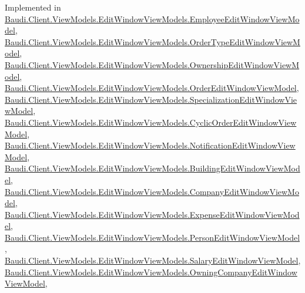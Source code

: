 Implemented in \hyperlink{class_baudi_1_1_client_1_1_view_models_1_1_edit_window_view_models_1_1_employee_edit_window_view_model_a13a345a4c410f06daf9079520a31d5f6}{Baudi.\+Client.\+View\+Models.\+Edit\+Window\+View\+Models.\+Employee\+Edit\+Window\+View\+Model}, \hyperlink{class_baudi_1_1_client_1_1_view_models_1_1_edit_window_view_models_1_1_order_type_edit_window_view_model_a48e5d33ce4f04d3cef96b3c63ef1409a}{Baudi.\+Client.\+View\+Models.\+Edit\+Window\+View\+Models.\+Order\+Type\+Edit\+Window\+View\+Model}, \hyperlink{class_baudi_1_1_client_1_1_view_models_1_1_edit_window_view_models_1_1_ownership_edit_window_view_model_a82f0ab3b2df4452117fd1d4f97ba0cfd}{Baudi.\+Client.\+View\+Models.\+Edit\+Window\+View\+Models.\+Ownership\+Edit\+Window\+View\+Model}, \hyperlink{class_baudi_1_1_client_1_1_view_models_1_1_edit_window_view_models_1_1_order_edit_window_view_model_ade8351d2753ab70dc1084117dc3ae177}{Baudi.\+Client.\+View\+Models.\+Edit\+Window\+View\+Models.\+Order\+Edit\+Window\+View\+Model}, \hyperlink{class_baudi_1_1_client_1_1_view_models_1_1_edit_window_view_models_1_1_specialization_edit_window_view_model_a9b65b5193fa8bf34c1f224ac1c257b33}{Baudi.\+Client.\+View\+Models.\+Edit\+Window\+View\+Models.\+Specialization\+Edit\+Window\+View\+Model}, \hyperlink{class_baudi_1_1_client_1_1_view_models_1_1_edit_window_view_models_1_1_cyclic_order_edit_window_view_model_a4ea63b211ca97a8337af850b415f47a4}{Baudi.\+Client.\+View\+Models.\+Edit\+Window\+View\+Models.\+Cyclic\+Order\+Edit\+Window\+View\+Model}, \hyperlink{class_baudi_1_1_client_1_1_view_models_1_1_edit_window_view_models_1_1_notification_edit_window_view_model_a3dd14080d055dab5c537805c427ef784}{Baudi.\+Client.\+View\+Models.\+Edit\+Window\+View\+Models.\+Notification\+Edit\+Window\+View\+Model}, \hyperlink{class_baudi_1_1_client_1_1_view_models_1_1_edit_window_view_models_1_1_building_edit_window_view_model_a037fe91ae03a5a2652cf131509f4f672}{Baudi.\+Client.\+View\+Models.\+Edit\+Window\+View\+Models.\+Building\+Edit\+Window\+View\+Model}, \hyperlink{class_baudi_1_1_client_1_1_view_models_1_1_edit_window_view_models_1_1_company_edit_window_view_model_a2ed6ebf023930b5bd4432880049b5604}{Baudi.\+Client.\+View\+Models.\+Edit\+Window\+View\+Models.\+Company\+Edit\+Window\+View\+Model}, \hyperlink{class_baudi_1_1_client_1_1_view_models_1_1_edit_window_view_models_1_1_expense_edit_window_view_model_a5253620600d337805963c5a0e48fa597}{Baudi.\+Client.\+View\+Models.\+Edit\+Window\+View\+Models.\+Expense\+Edit\+Window\+View\+Model}, \hyperlink{class_baudi_1_1_client_1_1_view_models_1_1_edit_window_view_models_1_1_person_edit_window_view_model_ae8d99ae35fac6e5a4bdf2406288dcfd4}{Baudi.\+Client.\+View\+Models.\+Edit\+Window\+View\+Models.\+Person\+Edit\+Window\+View\+Model}, \hyperlink{class_baudi_1_1_client_1_1_view_models_1_1_edit_window_view_models_1_1_salary_edit_window_view_model_a375f2c42ab83bb3d21388a555ecc1b82}{Baudi.\+Client.\+View\+Models.\+Edit\+Window\+View\+Models.\+Salary\+Edit\+Window\+View\+Model}, \hyperlink{class_baudi_1_1_client_1_1_view_models_1_1_edit_window_view_models_1_1_owning_company_edit_window_view_model_a8a3836e26449d12e9c8d9a08590a004f}{Baudi.\+Client.\+View\+Models.\+Edit\+Window\+View\+Models.\+Owning\+Company\+Edit\+Window\+View\+Model}, 